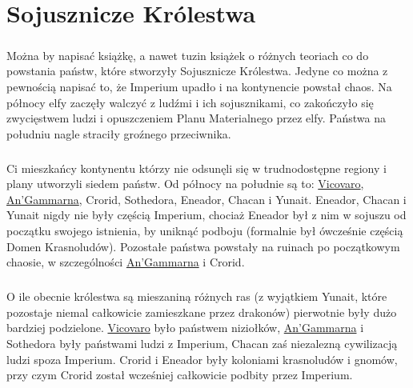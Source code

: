 \documentclass[10pt,twoside,twocolumn]{book}
\begin{document}
\label{SojuszniczeKrolestwa}
\chapter{Sojusznicze Królestwa}

\paragraph{}
Można by napisać książkę, a nawet tuzin książek o różnych teoriach co do powstania państw, które stworzyły Sojusznicze Królestwa.
Jedyne co można z pewnością napisać to, że Imperium upadło i na kontynencie powstał chaos.
Na północy elfy zaczęły walczyć z ludźmi i ich sojusznikami, co zakończyło się zwycięstwem ludzi i opuszczeniem Planu Materialnego przez elfy.
Państwa na południu nagle straciły groźnego przeciwnika.

\paragraph{}
Ci mieszkańcy kontynentu którzy nie odsunęli się w trudnodostępne regiony i plany utworzyli siedem państw.
Od północy na południe są to: \hyperref[Vicovaro]{Vicovaro}, \hyperref[AnGammarna]{An’Gammarna}, Crorid, Sothedora, Eneador, Chacan i Yunait.
Eneador, Chacan i Yunait nigdy nie były częścią Imperium, chociaż Eneador był z nim w sojuszu od początku swojego istnienia, by uniknąć podboju (formalnie był ówcześnie częścią Domen Krasnoludów).
Pozostałe państwa powstały na ruinach po początkowym chaosie, w szczególności \hyperref[AnGammarna]{An’Gammarna} i Crorid.

\paragraph{}
O ile obecnie królestwa są mieszaniną różnych ras (z wyjątkiem Yunait, które pozostaje niemal całkowicie zamieszkane przez drakonów) pierwotnie były dużo bardziej podzielone.
\hyperref[Vicovaro]{Vicovaro} było państwem niziołków, \hyperref[AnGammarna]{An'Gammarna} i Sothedora były państwami ludzi z Imperium, Chacan zaś niezalezną cywilizacją ludzi spoza Imperium.
Crorid i Eneador były koloniami krasnoludów i gnomów, przy czym Crorid został wcześniej całkowicie podbity przez Imperium.
\end{document}
